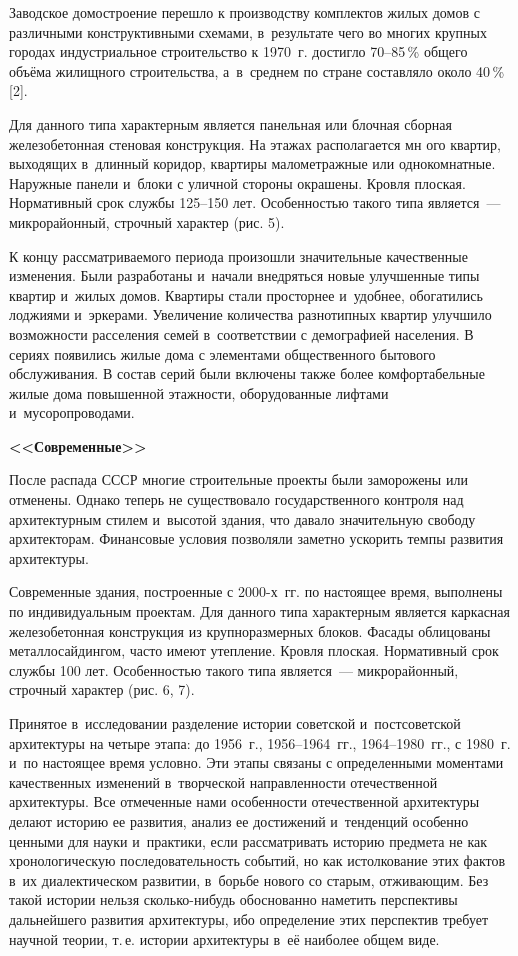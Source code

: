 Заводское домостроение перешло к производству комплектов жилых домов с различными конструктивными схемами, в~результате чего во многих крупных городах индустриальное строительство к 1970~г. достигло 70--85\,\% общего объёма жилищного строительства, а~в~среднем по стране составляло около 40\,\% [2].

Для данного типа характерным является панельная или блочная сборная железобетонная стеновая конструкция. На этажах располагается мн ого квартир, выходящих в~длинный коридор, квартиры малометражные или однокомнатные. Наружные панели и~блоки с уличной стороны окрашены. Кровля плоская. Нормативный срок службы 125--150 лет. Особенностью такого типа является~--- микрорайонный, строчный характер (рис. 5).



К концу рассматриваемого периода произошли значительные качественные изменения. Были разработаны и~начали внедряться новые улучшенные типы квартир и~жилых домов. Квартиры стали просторнее и~удобнее, обогатились лоджиями и~эркерами. Увеличение количества разнотипных квартир улучшило возможности расселения семей в~соответствии с демографией населения. В сериях появились жилые дома с элементами общественного бытового обслуживания. В состав серий были включены также более комфортабельные жилые дома повышенной этажности, оборудованные лифтами и~мусоропроводами.

\textbf{<<Современные>>}

После распада СССР многие строительные проекты были заморожены или отменены. Однако теперь не существовало государственного контроля над архитектурным стилем и~высотой здания, что давало значительную свободу архитекторам. Финансовые условия позволяли заметно ускорить темпы развития архитектуры.

Современные здания, построенные с 2000-х~гг. по настоящее время, выполнены по индивидуальным проектам. Для данного типа характерным является каркасная железобетонная конструкция из крупноразмерных блоков. Фасады облицованы металлосайдингом, часто имеют утепление. Кровля плоская. Нормативный срок службы 100 лет. Особенностью такого типа является~--- микрорайонный, строчный характер (рис. 6, 7).


\vspace{-12pt}
Принятое в~исследовании разделение истории советской и~постсоветской архитектуры на четыре этапа: до 1956~г., 1956--1964~гг., 1964--1980~гг., с 1980~г. и~по настоящее время условно. Эти этапы связаны с определенными моментами качественных изменений в~творческой направленности отечественной архитектуры. Все отмеченные нами особенности отечественной архитектуры делают историю ее развития, анализ ее достижений и~тенденций особенно ценными для науки и~практики, если рассматривать историю предмета не как хронологическую последовательность событий, но как истолкование этих фактов в~их диалектическом развитии, в~борьбе нового со старым, отживающим. Без такой истории нельзя сколько-нибудь обоснованно наметить перспективы дальнейшего развития архитектуры, ибо определение этих перспектив требует научной теории, т.\,е. истории архитектуры в~её наиболее общем виде.

